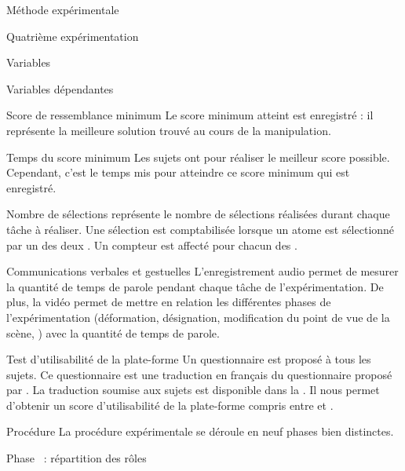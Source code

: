 \documentclass[myfrancais]{mythesis}
\begin{document}
\begin{mychapter}{Méthode expérimentale}
\begin{mysection}{Quatrième expérimentation}
\begin{mysubsection}{Variables}
\begin{mysubsubsection}{Variables dépendantes}
\begin{myparagraph}{ Score de ressemblance minimum}
						Le score minimum atteint est enregistré : il représente la meilleure solution trouvé au cours de la manipulation.
					\end{myparagraph}
					\begin{myparagraph}{ Temps du score  minimum}
						Les sujets ont  pour réaliser le meilleur score  possible.
						Cependant, c'est le temps mis pour atteindre ce score minimum qui est enregistré.
					\end{myparagraph}
					\begin{myparagraph}{ Nombre de sélections}
						 représente le nombre de sélections réalisées durant chaque tâche à réaliser.
						Une sélection est comptabilisée lorsque un atome est sélectionné par un des deux .
						Un compteur est affecté pour chacun des .
					\end{myparagraph}
					\begin{myparagraph}{ Communications verbales et gestuelles}
						L'enregistrement audio permet de mesurer la quantité de temps de parole pendant chaque tâche de l'expérimentation.
						De plus, la vidéo permet de mettre en relation les différentes phases de l'expérimentation (déformation, désignation, modification du point de vue de la scène, \myetc) avec la quantité de temps de parole.
					\end{myparagraph}
					\begin{myparagraph}{ Test d'utilisabilité de la plate-forme}
						Un questionnaire est proposé à tous les sujets.
						Ce questionnaire est une traduction en français du questionnaire  proposé par .
						La traduction soumise aux sujets est disponible dans la .
						Il nous permet d'obtenir un score d'utilisabilité de la plate-forme compris entre  et .
					\end{myparagraph}
				\end{mysubsubsection}
			\end{mysubsection}
			\begin{mysubsection}{Procédure}
				La procédure expérimentale se déroule en neuf phases bien distinctes.
				\begin{myparagraph}{Phase~ : répartition des rôles}

\end{myparagraph}
\end{mysubsection}
\end{mysection}
\end{mychapter}
\end{document}
